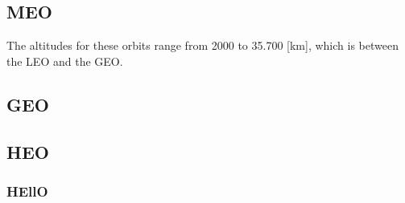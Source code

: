 \subsection{\ac{MEO}}
\label{sec:blOrb2}
The altitudes for these orbits range from 2000 to 35.700 [km], which is between the \acs{LEO} and the \ac{GEO}.

\subsection{\ac{GEO}}
\label{sec:blOrb3}

\subsection{\ac{HEO}}
\label{sec:blOrb4}

\subsubsection{\ac{HEllO}}
\label{sec:blOrb4.5}
